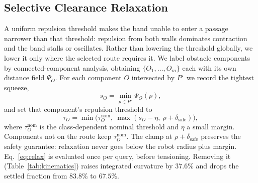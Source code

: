 \documentclass[conference]{IEEEtran}
\begin{document}
\subsection{Selective Clearance Relaxation}
A uniform repulsion threshold makes the band unable to enter a passage narrower than that threshold: repulsion from both walls dominates contraction and the band stalls or oscillates. Rather than lowering the threshold globally, we lower it only where the selected route requires it.
We label obstacle components by connected-component analysis, obtaining $\{O_1,\dots,O_m\}$ each with its own distance field $\Psi_{O}$. For each component $O$ intersected by $P^\star$ we record the tightest squeeze,
\begin{equation}
s_O=\min_{p\in P^\star}\Psi_O(p),
\end{equation}
and set that component's repulsion threshold to
\begin{equation}
\tau_O=\min\big(\tau_O^{\mathrm{nom}},\ \max(s_O-\eta,\ \rho+\delta_{\mathrm{safe}})\big),
\label{eq:relax}
\end{equation}
where $\tau_O^{\mathrm{nom}}$ is the class-dependent nominal threshold and $\eta$ a small margin. Components not on the route keep $\tau_O^{\mathrm{nom}}$. The clamp at $\rho+\delta_{\mathrm{safe}}$ preserves the safety guarantee: relaxation never goes below the robot radius plus margin. Eq.~\eqref{eq:relax} is evaluated once per query, before tensioning. Removing it (Table~\ref{tab:kinematics}) raises integrated curvature by $37.6\%$ and drops the settled fraction from $83.8\%$ to $67.5\%$.
\end{document}
